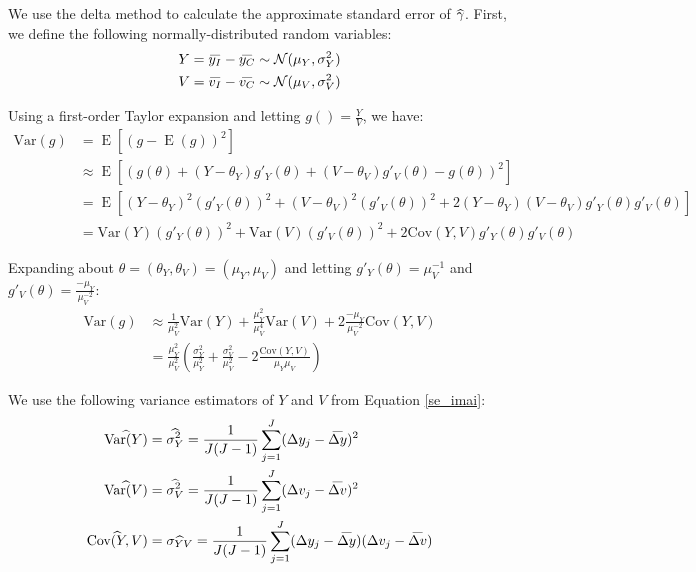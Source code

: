 \documentclass[12pt]{article}
\newcommand\wh[1]{\hstretch{2}{\hat{\hstretch{.5}{#1}}}}
\newcommand\wb[1]{\hstretch{2}{\bar{\hstretch{.5}{#1}}}}
\begin{document}
We use the delta method to calculate the approximate standard error of $\wh{\gamma}$. First, we define the following normally-distributed random variables:
\begin{equation}
\begin{split}
Y = \wb{y_I} - \wb{y_C} \sim \mathcal{N}(\mu_Y, \sigma^2_Y) \\
V = \wb{v_I} - \wb{v_C} \sim \mathcal{N}(\mu_V, \sigma^2_V)
\end{split}
\end{equation}

Using a first-order Taylor expansion and letting $g() = \frac{Y}{V}$, we have:
\begin{equation}
\begin{split}
	\text{Var}(g) & = \operatorname{E}[(g - \operatorname{E}(g))^2] \\
	& \approx \operatorname{E}[(g(\theta) + (Y-\theta_Y)g'_Y(\theta) + (V-\theta_V)g'_V(\theta) - g(\theta))^2] \\
	& = \operatorname{E}[(Y-\theta_Y)^2 (g'_Y(\theta))^2 + (V-\theta_V)^2 (g'_V(\theta))^2 + 2(Y-\theta_Y)(V-\theta_V)g'_Y(\theta)g'_V(\theta)] \\
	& = \text{Var}(Y)(g'_Y(\theta))^2 + \text{Var}(V)(g'_V(\theta))^2 + 2\text{Cov}(Y,V)g'_Y(\theta)g'_V(\theta)
\end{split}
\end{equation}

Expanding about $\theta=(\theta_Y,\theta_V)=(\mu_Y,\mu_V)$ and letting $g'_Y(\theta) = \mu_V^{-1}$ and $g'_V(\theta) = \frac{-\mu_Y}{\mu_V^{-2}}$:
\begin{equation} \label{var_expanded}
\begin{split}
	\text{Var}(g) & \approx \frac{1}{\mu_V^2}\text{Var}(Y) + \frac{\mu_Y^2}{\mu_V^4}\text{Var}(V) + 2\frac{-\mu_Y}{\mu_V^{-2}}\text{Cov}(Y,V) \\
	& = \frac{\mu_Y^2}{\mu_V^2}(\frac{\sigma_Y^2}{\mu_Y^2} + \frac{\sigma_V^2}{\mu_V^2} - 2\frac{\text{Cov}(Y,V)}{\mu_Y \mu_V})
\end{split}
\end{equation}

We use the following variance estimators of $Y$ and $V$ from Equation \ref{se_imai}:
\begin{equation}
\begin{split}
\wh{\text{Var}(Y)} & = \wh{\sigma_Y^2} = \frac{1}{J(J-1)}\sum_{j=1}^{J} (\Delta y_j - \wb{\Delta y})^2 \\
\wh{\text{Var}(V)} & = \wh{\sigma_V^2} = \frac{1}{J(J-1)}\sum_{j=1}^{J} (\Delta v_j - \wb{\Delta v})^2 \\
\wh{\text{Cov}(Y,V)} & = \wh{\sigma_{YV}} = \frac{1}{J(J-1)}\sum_{j=1}^{J} (\Delta y_j - \wb{\Delta y})(\Delta v_j - \wb{\Delta v})
\end{split}
\end{equation}
\end{document}
